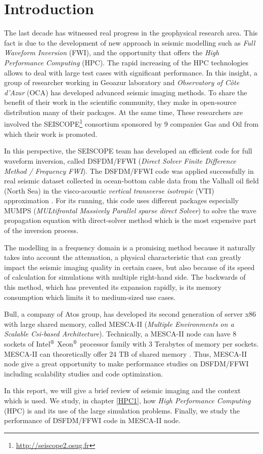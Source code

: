 \chapter{Introduction}
\label{chp: chap1}

The last decade has witnessed real progress in the geophysical research area. This fact is due to the development of new approach in seismic modelling such as \textit{Full Waveform Inversion} (FWI), and the opportunity that offers the \textit{High Performance Computing} (HPC). The rapid increasing of the HPC technologies allows to deal with large test cases with significant performance. In this insight, a group of researcher working in Geoazur laboratory and \textit{Observatory of C\^{o}te d'Azur} (OCA) has developed advanced seismic imaging methods. To share the benefit of their work in the scientific community, they make in open-source distribution many of their packages. At the same time, These researchers are involved the SEISCOPE\footnote{\url{http://seiscope2.osug.fr}} consortium sponsored by 9 companies Gas and Oil from which their work is promoted. 

In this perspective, the SEISCOPE team has developed an efficient code for full waveform inversion, called DSFDM/FFWI (\textit{Direct Solver Finite Difference Method / Frequency FWI}). The DSFDM/FFWI code was applied successfully in real seismic dataset collected in ocean-bottom cable data from the Valhall oil field (North Sea) in the visco-acoustic \textit{vertical transverse isotropic} (VTI) approximation \cite{Operto2015,Amestoy2016}. For its running, this code uses different packages especially MUMPS (\textit{MULtifrontal Massively Parallel sparse direct Solver}) to solve the wave propagation equation with direct-solver method which is the most expensive part of the inversion process. 

The modelling in a frequency domain is a promising method because it naturally takes into account the attenuation, a physical characteristic that can greatly impact the seismic imaging quality in certain cases,  but also because of its speed of calculation for simulations with multiple right-hand side. The backwards of this method, which has prevented its expansion rapidly, is its memory consumption which limits it to medium-sized use cases.

Bull, a company of Atos group, has developed its second generation of server x86 with large shared memory, called MESCA-II (\textit{Multiple Environments on a Scalable Csi-based Architecture}). Technically, a MESCA-II node can have 8 sockets of Intel$^{\mbox{\scriptsize{\textregistered}}}$ Xeon$^{\mbox{\scriptsize{\textregistered}}}$ processor family with 3 Terabytes of memory per sockets. MESCA-II can theoretically offer 24 TB of shared memory . Thus, MESCA-II node give a great opportunity to make performance studies on DSFDM/FFWI including scalability studies and code optimization.

In this report, we will give a brief review of seismic imaging and the context which is used. We study, in chapter \ref{HPC1},   how \textit{High Performance Computing} (HPC) is and its use of the large simulation problems. Finally, we study the performance of DSFDM/FFWI code in MESCA-II node.


